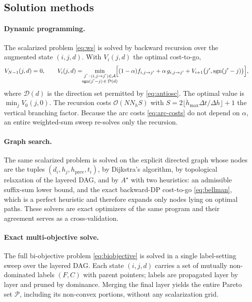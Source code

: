 \subsection{Solution methods}
\label{sec:methods}

\paragraph{Dynamic programming.}
The scalarized problem \eqref{eq:ws} is solved by backward recursion over the
augmented state $(i,j,d)$. With $V_i(j,d)$ the optimal cost-to-go,
%
\begin{equation}
  V_{N-1}(j,d)=0,
  \qquad
  V_i(j,d)=\!\!\min_{\substack{j'\,:\,(i,j\to j')\in\mathcal{A}\\
  \operatorname{sgn}(j'-j)\,\in\,\mathcal{D}(d)}}\!\!
  \Bigl[(1-\alpha)f_{i,j\to j'}+\alpha\,g_{i,j\to j'}
  +V_{i+1}\bigl(j',\operatorname{sgn}(j'-j)\bigr)\Bigr],
  \label{eq:bellman}
\end{equation}
%
where $\mathcal{D}(d)$ is the direction set permitted by \eqref{eq:antiosc}. The
optimal value is $\min_j V_0(j,0)$. The recursion costs
$\mathcal{O}(N N_h S)$ with $S=2\lfloor \dot h_{\max}\Delta t/\Delta h\rfloor+1$
the vertical branching factor. Because the arc costs \eqref{eq:arc-costs} do not
depend on $\alpha$, an entire weighted-sum sweep re-solves only the recursion.

\paragraph{Graph search.}
The same scalarized problem is solved on the explicit directed graph whose nodes
are the tuples $(d_i,h_j,h_{\mathrm{prev}},t_i)$, by Dijkstra's algorithm, by
topological relaxation of the layered DAG, and by $A^\star$ with two heuristics:
an admissible suffix-sum lower bound, and the exact backward-DP cost-to-go
\eqref{eq:bellman}, which is a perfect heuristic and therefore expands only
nodes lying on optimal paths. These solvers are exact optimizers of the same
program and their agreement serves as a cross-validation.

\paragraph{Exact multi-objective solve.}
The full bi-objective problem \eqref{eq:biobjective} is solved in a single
label-setting sweep over the layered DAG. Each state $(i,j,d)$ carries a set of
mutually non-dominated labels $(F,C)$ with parent pointers; labels are
propagated layer by layer and pruned by dominance. Merging the final layer
yields the entire Pareto set $\mathcal{P}$, including its non-convex portions,
without any scalarization grid.


